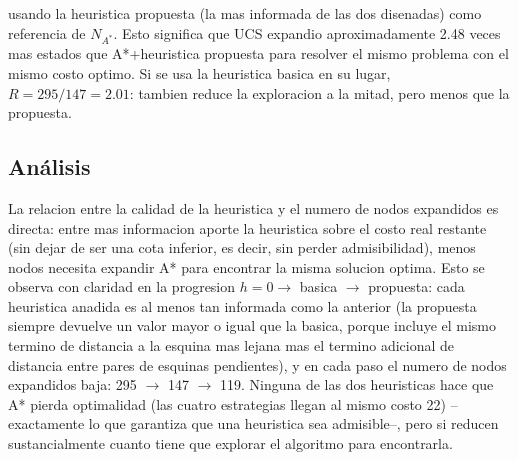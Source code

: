 usando la heuristica propuesta (la mas informada de las dos disenadas) como referencia de
$N_{A^*}$. Esto significa que UCS expandio aproximadamente 2.48 veces mas estados que
A*+heuristica propuesta para resolver el mismo problema con el mismo costo optimo. Si se usa la
heuristica basica en su lugar, $R = 295/147 = 2.01$: tambien reduce la exploracion a la mitad,
pero menos que la propuesta.

\subsection{Análisis}

La relacion entre la calidad de la heuristica y el numero de nodos expandidos es directa: entre
mas informacion aporte la heuristica sobre el costo real restante (sin dejar de ser una cota
inferior, es decir, sin perder admisibilidad), menos nodos necesita expandir A* para encontrar la
misma solucion optima. Esto se observa con claridad en la progresion
$h=0 \to$ basica $\to$ propuesta: cada heuristica anadida es al menos tan informada como la
anterior (la propuesta siempre devuelve un valor mayor o igual que la basica, porque incluye el
mismo termino de distancia a la esquina mas lejana mas el termino adicional de distancia entre
pares de esquinas pendientes), y en cada paso el numero de nodos expandidos baja: 295 $\to$ 147
$\to$ 119. Ninguna de las dos heuristicas hace que A* pierda optimalidad (las cuatro estrategias
llegan al mismo costo 22) --exactamente lo que garantiza que una heuristica sea admisible--, pero
si reducen sustancialmente cuanto tiene que explorar el algoritmo para encontrarla.
